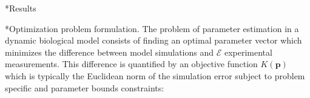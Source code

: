 \documentclass[12pt]{article}
\makeatletter
\renewcommand\subsection{\@startsection
	{subsection}{2}{0mm}
	{-0.05in}
	{-0.5\baselineskip}
	{\normalfont\normalsize\bfseries}}
\renewcommand\section{\@startsection
	{subsection}{2}{0mm}
	{-0.2in}
	{0.05\baselineskip}
	{\normalfont\large\bfseries}}
\makeatother
\begin{document}

\clearpage

\section*{Results}

\subsection*{Optimization problem formulation.}
The problem of parameter estimation in a dynamic biological model consists of finding an optimal parameter vector
which minimizes the difference between model simulations and $\mathcal{E}$ experimental measurements. This difference is quantified by an objective function $K\left(\mathbf{p}\right)$
which is typically the Euclidean norm of the simulation error subject to problem specific and parameter bounds constraints:
\end{document}
